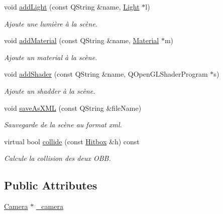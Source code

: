 \begin{DoxyCompactItemize}
void \hyperlink{class_scene_aedf1b6729e0feda58666662c349ffed1}{add\+Light} (const Q\+String \&name, \hyperlink{class_light}{Light} $\ast$l)
\begin{DoxyCompactList}\small\item\em Ajoute une lumière à la scène. \end{DoxyCompactList}\item 
void \hyperlink{class_scene_a68761479fea650973d31e2d9565f8aca}{add\+Material} (const Q\+String \&name, \hyperlink{class_material}{Material} $\ast$m)
\begin{DoxyCompactList}\small\item\em Ajoute un material à la scène. \end{DoxyCompactList}\item 
void \hyperlink{class_scene_ad15253a331423b1e3c3fb2484b10509c}{add\+Shader} (const Q\+String \&name, Q\+Open\+G\+L\+Shader\+Program $\ast$s)
\begin{DoxyCompactList}\small\item\em Ajoute un shadder à la scène. \end{DoxyCompactList}\item 
void \hyperlink{class_scene_ae87e88cbefc16640354acc8ec11b5e1e}{save\+As\+X\+M\+L} (const Q\+String \&file\+Name)
\begin{DoxyCompactList}\small\item\em Sauvegarde de la scène au format xml. \end{DoxyCompactList}\item 
virtual bool \hyperlink{class_scene_a55a738d6643c4d9964caf84a0d361dbe}{collide} (const \hyperlink{class_hitbox}{Hitbox} \&h) const 
\begin{DoxyCompactList}\small\item\em Calcule la collision des deux O\+B\+B. \end{DoxyCompactList}\end{DoxyCompactItemize}
\subsection*{Public Attributes}
\begin{DoxyCompactItemize}
\item 
\hyperlink{class_camera}{Camera} $\ast$ \hyperlink{class_scene_a8cce9e0f96edc8655a9b9a885e2c26bf}{\+\_\+camera}
\end{DoxyCompactItemize}
